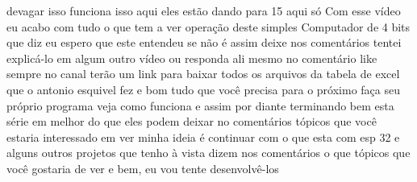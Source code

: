 \documentclass[oneside,11pt]{memoir} %
\begin{document}
devagar isso funciona isso  aqui eles estão dando para 15 aqui só  Com esse vídeo eu acabo com tudo  o que tem a ver  operação deste simples  Computador de 4 bits que diz eu espero  que este entendeu se não é assim  deixe nos comentários tentei  explicá-lo em algum outro vídeo ou  responda ali mesmo no comentário like  sempre no canal terão um link  para baixar todos os arquivos da tabela  de excel que o antonio esquivel fez e  bom tudo que você precisa para o próximo  faça seu próprio programa veja como  funciona e assim por diante  terminando bem esta série em  melhor do que eles podem deixar no  comentários tópicos que você estaria interessado em ver  minha ideia é continuar com o que esta com esp  32 e alguns outros projetos que tenho  à vista dizem nos comentários o que  tópicos que você gostaria de ver e bem, eu vou  tente desenvolvê-los

\end{document}
